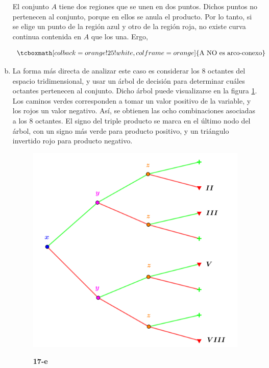 \documentclass{article}
\begin{document}
\begin{enumerate}[(a)]
El conjunto $A$ tiene dos regiones que se unen en dos puntos. Dichos puntos no pertenecen al conjunto, porque en ellos se anula el producto. Por lo tanto, si se elige un punto de la región azul y otro de la región roja, no existe curva continua contenida en $A$ que los una. Ergo,

\begin{equation}
\tcboxmath[colback=orange!25!white,colframe=orange]
{ \text{A NO es arco-conexo} }
\end{equation}

\item La forma más directa de analizar este caso es considerar los 8 octantes del espacio tridimensional, y usar un árbol de decisión para determinar cuáles octantes pertenecen al conjunto. Dicho árbol puede visualizarse en la figura \ref{fig:1-17-e}. Los caminos verdes corresponden a tomar un valor positivo de la variable, y los rojos un valor negativo. Así, se obtienen las ocho combinaciones asociadas a los 8 octantes. El signo del triple producto se marca en el último nodo del árbol, con un signo más verde para producto positivo, y un triángulo invertido rojo para producto negativo.

\begin{figure}[ht]
\caption{\textbf{17-e}}
\includegraphics[scale=0.5]{img/ejercicios/1/17-e.png} 
\centering
\label{fig:1-17-e}
\end{figure}


\end{enumerate}
\end{document}
